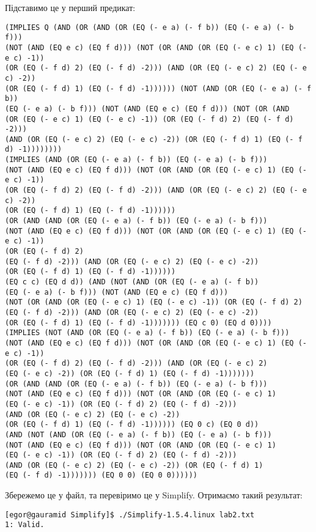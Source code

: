 \documentclass[14pt,a4paper]{extarticle}
\theoremstyle{definition}
\begin{document}
Підставимо це у перший предикат:
\begin{lstlisting}[breaklines=true,basicstyle= \ttfamily\footnotesize]
(IMPLIES Q (AND (OR (AND (OR (EQ (- e a) (- f b)) (EQ (- e a) (- b f)))
(NOT (AND (EQ e c) (EQ f d))) (NOT (OR (AND (OR (EQ (- e c) 1) (EQ (- e c) -1))
(OR (EQ (- f d) 2) (EQ (- f d) -2))) (AND (OR (EQ (- e c) 2) (EQ (- e c) -2))
(OR (EQ (- f d) 1) (EQ (- f d) -1)))))) (NOT (AND (OR (EQ (- e a) (- f b))
(EQ (- e a) (- b f))) (NOT (AND (EQ e c) (EQ f d))) (NOT (OR (AND
(OR (EQ (- e c) 1) (EQ (- e c) -1)) (OR (EQ (- f d) 2) (EQ (- f d) -2)))
(AND (OR (EQ (- e c) 2) (EQ (- e c) -2)) (OR (EQ (- f d) 1) (EQ (- f d) -1))))))))
(IMPLIES (AND (OR (EQ (- e a) (- f b)) (EQ (- e a) (- b f)))
(NOT (AND (EQ e c) (EQ f d))) (NOT (OR (AND (OR (EQ (- e c) 1) (EQ (- e c) -1))
(OR (EQ (- f d) 2) (EQ (- f d) -2))) (AND (OR (EQ (- e c) 2) (EQ (- e c) -2))
(OR (EQ (- f d) 1) (EQ (- f d) -1))))))
(OR (AND (AND (OR (EQ (- e a) (- f b)) (EQ (- e a) (- b f)))
(NOT (AND (EQ e c) (EQ f d))) (NOT (OR (AND (OR (EQ (- e c) 1) (EQ (- e c) -1))
(OR (EQ (- f d) 2)
(EQ (- f d) -2))) (AND (OR (EQ (- e c) 2) (EQ (- e c) -2))
(OR (EQ (- f d) 1) (EQ (- f d) -1))))))
(EQ c c) (EQ d d)) (AND (NOT (AND (OR (EQ (- e a) (- f b))
(EQ (- e a) (- b f))) (NOT (AND (EQ e c) (EQ f d)))
(NOT (OR (AND (OR (EQ (- e c) 1) (EQ (- e c) -1)) (OR (EQ (- f d) 2)
(EQ (- f d) -2))) (AND (OR (EQ (- e c) 2) (EQ (- e c) -2))
(OR (EQ (- f d) 1) (EQ (- f d) -1))))))) (EQ c 0) (EQ d 0))))
(IMPLIES (NOT (AND (OR (EQ (- e a) (- f b)) (EQ (- e a) (- b f)))
(NOT (AND (EQ e c) (EQ f d))) (NOT (OR (AND (OR (EQ (- e c) 1) (EQ (- e c) -1))
(OR (EQ (- f d) 2) (EQ (- f d) -2))) (AND (OR (EQ (- e c) 2)
(EQ (- e c) -2)) (OR (EQ (- f d) 1) (EQ (- f d) -1)))))))
(OR (AND (AND (OR (EQ (- e a) (- f b)) (EQ (- e a) (- b f)))
(NOT (AND (EQ e c) (EQ f d))) (NOT (OR (AND (OR (EQ (- e c) 1)
(EQ (- e c) -1)) (OR (EQ (- f d) 2) (EQ (- f d) -2)))
(AND (OR (EQ (- e c) 2) (EQ (- e c) -2))
(OR (EQ (- f d) 1) (EQ (- f d) -1)))))) (EQ 0 c) (EQ 0 d))
(AND (NOT (AND (OR (EQ (- e a) (- f b)) (EQ (- e a) (- b f)))
(NOT (AND (EQ e c) (EQ f d))) (NOT (OR (AND (OR (EQ (- e c) 1)
(EQ (- e c) -1)) (OR (EQ (- f d) 2) (EQ (- f d) -2)))
(AND (OR (EQ (- e c) 2) (EQ (- e c) -2)) (OR (EQ (- f d) 1)
(EQ (- f d) -1))))))) (EQ 0 0) (EQ 0 0))))))
\end{lstlisting}

Збережемо це у файл, та перевіримо це у Simplify. Отримаємо такий результат:
\begin{lstlisting}[breaklines=true,basicstyle= \ttfamily\footnotesize]
[egor@gauramid Simplify]$ ./Simplify-1.5.4.linux lab2.txt
1: Valid.
\end{lstlisting}
\end{document}
